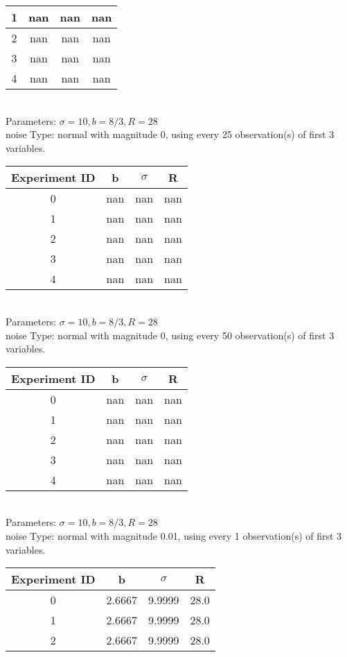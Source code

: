 \begin{multicols}{3}
\begin{tabular}{cccc}
 1 & nan & nan & nan\\ \hline 
 2 & nan & nan & nan\\ \hline 
 3 & nan & nan & nan\\ \hline 
 4 & nan & nan & nan\\ \hline 
 \end{tabular}\\
Parameters: $\sigma=10, b=8/3, R=28$\\
noise Type: normal with magnitude 0, using every 25 observation(s) of first 3 variables.\\
\begin{tabular}{cccc}
\hline Experiment ID & b & $\sigma$ & R \\ \hline 
0 & nan & nan & nan\\ \hline 
 1 & nan & nan & nan\\ \hline 
 2 & nan & nan & nan\\ \hline 
 3 & nan & nan & nan\\ \hline 
 4 & nan & nan & nan\\ \hline 
 \end{tabular}\\
Parameters: $\sigma=10, b=8/3, R=28$\\
noise Type: normal with magnitude 0, using every 50 observation(s) of first 3 variables.\\
\begin{tabular}{cccc}
\hline Experiment ID & b & $\sigma$ & R \\ \hline 
0 & nan & nan & nan\\ \hline 
 1 & nan & nan & nan\\ \hline 
 2 & nan & nan & nan\\ \hline 
 3 & nan & nan & nan\\ \hline 
 4 & nan & nan & nan\\ \hline 
 \end{tabular}\\
Parameters: $\sigma=10, b=8/3, R=28$\\
noise Type: normal with magnitude 0.01, using every 1 observation(s) of first 3 variables.\\
\begin{tabular}{cccc}
\hline Experiment ID & b & $\sigma$ & R \\ \hline 
0 & 2.6667 & 9.9999 & 28.0\\ \hline 
 1 & 2.6667 & 9.9999 & 28.0\\ \hline 
 2 & 2.6667 & 9.9999 & 28.0\\ \hline 

\end{tabular}
\end{multicols}
